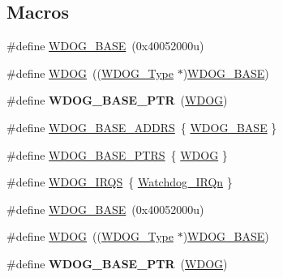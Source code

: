 \subsection*{Macros}
\begin{DoxyCompactItemize}
\item 
\#define \hyperlink{group__WDOG__Peripheral__Access__Layer_ga0c092d77d4599871d1ebda1a3a28e887}{W\+D\+O\+G\+\_\+\+B\+A\+SE}~(0x40052000u)
\item 
\#define \hyperlink{group__WDOG__Peripheral__Access__Layer_gab938901a5fa5443253fc293ebd0399e3}{W\+D\+OG}~((\hyperlink{structWDOG__Type}{W\+D\+O\+G\+\_\+\+Type} $\ast$)\hyperlink{group__WDOG__Peripheral__Access__Layer_ga0c092d77d4599871d1ebda1a3a28e887}{W\+D\+O\+G\+\_\+\+B\+A\+SE})
\item 
\#define {\bfseries W\+D\+O\+G\+\_\+\+B\+A\+S\+E\+\_\+\+P\+TR}~(\hyperlink{group__WDOG__Peripheral__Access__Layer_gab938901a5fa5443253fc293ebd0399e3}{W\+D\+OG})\hypertarget{group__WDOG__Peripheral__Access__Layer_ga72fb27c7bc1ae124f180d8f2c7b9fa79}{}\label{group__WDOG__Peripheral__Access__Layer_ga72fb27c7bc1ae124f180d8f2c7b9fa79}

\item 
\#define \hyperlink{group__WDOG__Peripheral__Access__Layer_gaa48c10a6a132d044b0d2a7b495b303da}{W\+D\+O\+G\+\_\+\+B\+A\+S\+E\+\_\+\+A\+D\+D\+RS}~\{ \hyperlink{group__WDOG__Peripheral__Access__Layer_ga0c092d77d4599871d1ebda1a3a28e887}{W\+D\+O\+G\+\_\+\+B\+A\+SE} \}
\item 
\#define \hyperlink{group__WDOG__Peripheral__Access__Layer_ga8d50dba3756857eed1783b3d726d40d8}{W\+D\+O\+G\+\_\+\+B\+A\+S\+E\+\_\+\+P\+T\+RS}~\{ \hyperlink{group__WDOG__Peripheral__Access__Layer_gab938901a5fa5443253fc293ebd0399e3}{W\+D\+OG} \}
\item 
\#define \hyperlink{group__WDOG__Peripheral__Access__Layer_gad44cf9ab5d5c2116869c5570758d4eeb}{W\+D\+O\+G\+\_\+\+I\+R\+QS}~\{ \hyperlink{group__Interrupt__vector__numbers_gga666eb0caeb12ec0e281415592ae89083a3f04766f3177f0152623a86e39ccef06}{Watchdog\+\_\+\+I\+R\+Qn} \}
\item 
\#define \hyperlink{group__WDOG__Peripheral__Access__Layer_ga0c092d77d4599871d1ebda1a3a28e887}{W\+D\+O\+G\+\_\+\+B\+A\+SE}~(0x40052000u)
\item 
\#define \hyperlink{group__WDOG__Peripheral__Access__Layer_gab938901a5fa5443253fc293ebd0399e3}{W\+D\+OG}~((\hyperlink{structWDOG__Type}{W\+D\+O\+G\+\_\+\+Type} $\ast$)\hyperlink{group__WDOG__Peripheral__Access__Layer_ga0c092d77d4599871d1ebda1a3a28e887}{W\+D\+O\+G\+\_\+\+B\+A\+SE})
\item 
\#define {\bfseries W\+D\+O\+G\+\_\+\+B\+A\+S\+E\+\_\+\+P\+TR}~(\hyperlink{group__WDOG__Peripheral__Access__Layer_gab938901a5fa5443253fc293ebd0399e3}{W\+D\+OG})\hypertarget{group__WDOG__Peripheral__Access__Layer_ga72fb27c7bc1ae124f180d8f2c7b9fa79}{}\label{group__WDOG__Peripheral__Access__Layer_ga72fb27c7bc1ae124f180d8f2c7b9fa79}


\end{DoxyCompactItemize}
